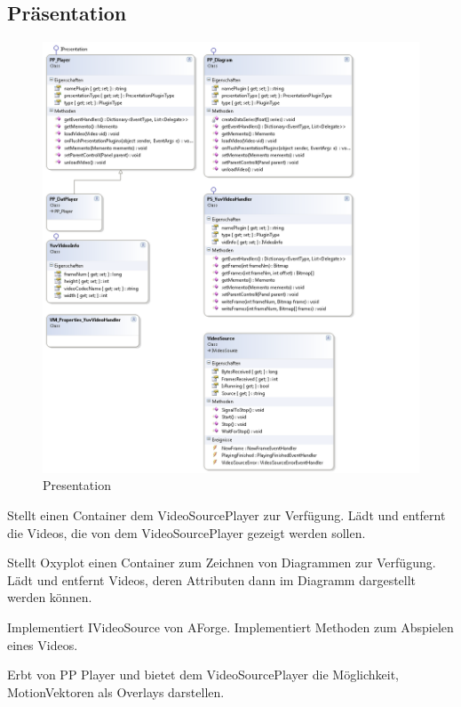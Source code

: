 \subsection{Präsentation}
\begin{figure}[H]
\noindent\includegraphics[width=\linewidth,height=\textheight,
keepaspectratio]{bilder/Klassendiagramm/Plugins1.png}
\caption{Presentation}
\end{figure}

Stellt einen Container dem VideoSourcePlayer zur Verfügung. Lädt und entfernt die Videos, die von dem VideoSourcePlayer gezeigt werden sollen.


Stellt Oxyplot einen Container zum Zeichnen von Diagrammen zur Verfügung. Lädt und entfernt Videos, deren Attributen dann im Diagramm dargestellt werden können.


Implementiert IVideoSource von AForge. Implementiert Methoden zum Abspielen eines Videos.


Erbt von PP Player und bietet dem VideoSourcePlayer die Möglichkeit, MotionVektoren als Overlays darstellen.



